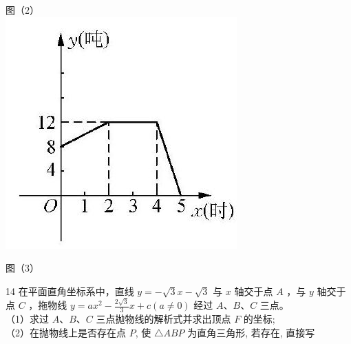 \documentclass[10pt]{article}
\begin{document}
图（2）\\
\includegraphics[max width=\textwidth, center]{2024_10_30_1bf34f7aeb61f11d11d3g-105(2)}

图（3）

14 在平面直角坐标系中，直线 $y=-\sqrt{3} x-\sqrt{3}$ 与 $x$ 轴交于点 $A$ ，与 $y$ 轴交于点 $C$ ，拖物线 $y=a x^{2}-\frac{2 \sqrt{3}}{3} x+c(a \neq 0)$ 经过 $A 、 B 、 C$ 三点。\\
（1）求过 $A 、 B 、 C$ 三点抛物线的解析式并求出顶点 $F$ 的坐标;\\
（2）在抛物线上是否存在点 $P$, 使 $\triangle A B P$ 为直角三角形, 若存在, 直接写
\end{document}
